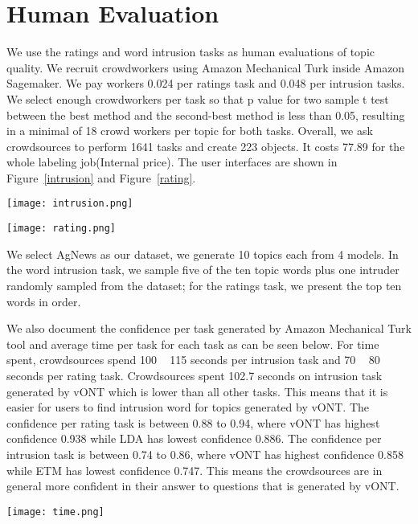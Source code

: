 \documentclass[11pt]{article}
\begin{document}
\section{Human Evaluation} \label{humanEval:sec}
We use the ratings and word intrusion tasks as human evaluations of topic quality. We recruit crowdworkers using Amazon Mechanical Turk inside Amazon Sagemaker. We pay workers 0.024 per ratings task and 0.048 per intrusion tasks. We select enough crowdworkers per task  so that p value for two sample t test between the best method and the second-best method is less than 0.05, resulting in a minimal of 18 crowd workers per topic for both tasks. Overall, we ask crowdsources to perform 1641 tasks and create 223 objects. It costs 77.89 for the whole labeling job(Internal price). The user interfaces are shown in Figure~\ref{intrusion} and Figure~\ref{rating}. 
\begin{figure*}
\centering
\texttt{[image: intrusion.png]}
\caption{User interface of intrusion task }
\label{intrusion}
\end{figure*}

\begin{figure*}
\centering
\texttt{[image: rating.png]}
\caption{User interface of rating task }
\label{rating}
\end{figure*}

We select AgNews as our dataset, we generate 10 topics each from 4 models. In the word intrusion task, we sample five of the ten topic words plus one intruder randomly sampled from the dataset; for the ratings task, we present the top ten words in order. 


We also document the confidence per task generated by Amazon Mechanical Turk tool and average time per task for each task as can be seen below. For time spent, crowdsources spend 100 ~ 115 seconds per intrusion task and 70 ~ 80 seconds per rating task. Crowdsources spent 102.7 seconds on intrusion task generated by vONT which is lower than all other tasks. This means that it is easier for users to find intrusion word for topics generated by vONT. The confidence per rating task is between 0.88 to 0.94, where vONT has highest confidence 0.938 while LDA has lowest confidence 0.886. The confidence per intrusion task is between 0.74 to 0.86, where vONT has highest confidence 0.858 while ETM has lowest confidence 0.747. This means the crowdsources are in general more confident in their answer to questions that is generated by vONT.

\begin{figure*}
\centering
\texttt{[image: time.png]}
\caption{Compare different methods' time spend per task }
\label{time}
\end{figure*}
\end{document}
